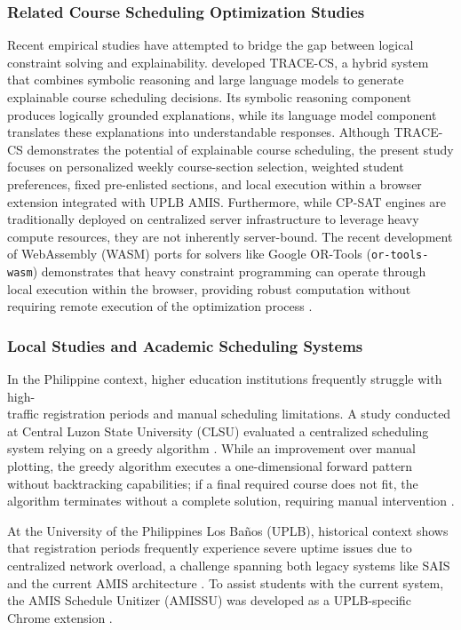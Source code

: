 \documentclass{icsthesis}
\begin{document}
\begin{mainmatter}
		\subsubsection{Related Course Scheduling Optimization Studies}
		Recent empirical studies have attempted to bridge the gap between logical constraint solving and explainability. \citet{vasileiou2025} developed TRACE-CS, a hybrid system that combines symbolic reasoning and large language models to generate explainable course scheduling decisions. Its symbolic reasoning component produces logically grounded explanations, while its language model component translates these explanations into understandable responses. Although TRACE-CS demonstrates the potential of explainable course scheduling, the present study focuses on personalized weekly course-section selection, weighted student preferences, fixed pre-enlisted sections, and local execution within a browser extension integrated with UPLB AMIS. Furthermore, while CP-SAT engines are traditionally deployed on centralized server infrastructure to leverage heavy compute resources, they are not inherently server-bound. The recent development of WebAssembly (WASM) ports for solvers like Google OR-Tools (\texttt{or-tools-wasm}) demonstrates that heavy constraint programming can operate through local execution within the browser, providing robust computation without requiring remote execution of the optimization process \citep{wickman2026}.
		
		\subsubsection{Local Studies and Academic Scheduling Systems}
		In the Philippine context, higher education institutions frequently struggle with high-\\traffic registration periods and manual scheduling limitations. A study conducted at Central Luzon State University (CLSU) evaluated a centralized scheduling system relying on a greedy algorithm \citep{botangen2014}. While an improvement over manual plotting, the greedy algorithm executes a one-dimensional forward pattern without backtracking capabilities; if a final required course does not fit, the algorithm terminates without a complete solution, requiring manual intervention \citep{botangen2014}.
		
		At the University of the Philippines Los Ba\~{n}os (UPLB), historical context shows that registration periods frequently experience severe uptime issues due to centralized network overload, a challenge spanning both legacy systems like SAIS and the current AMIS architecture \citep{hermocilla2022}. To assist students with the current system, the AMIS Schedule Unitizer (AMISSU) was developed as a UPLB-specific Chrome extension \citep{amissu2023}.
		

\end{mainmatter}
\end{document}
